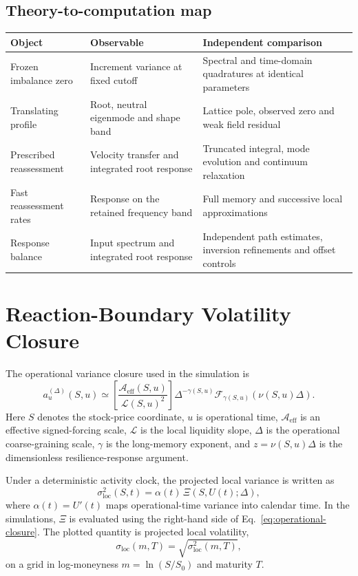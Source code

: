 \documentclass[11pt]{article}
\newcommand{\Aeff}{\mathcal A_{\mathrm{eff}}}
\newcommand{\Liq}{\mathcal L}
\newcommand{\Fresp}{\mathcal F}
\newcommand{\sigloc}{\sigma_{\mathrm{loc}}}
\begin{document}
\subsection{Theory-to-computation map}
\begin{center}
\small
\begin{tabular}{p{.23\linewidth}p{.31\linewidth}p{.36\linewidth}}
\toprule
Object & Observable & Independent comparison \\
\midrule
Frozen imbalance zero & Increment variance at fixed cutoff & Spectral and time-domain quadratures at identical parameters \\
Translating profile & Root, neutral eigenmode and shape band & Lattice pole, observed zero and weak field residual \\
Prescribed reassessment & Velocity transfer and integrated root response & Truncated integral, mode evolution and continuum relaxation \\
Fast reassessment rates & Response on the retained frequency band & Full memory and successive local approximations \\
Response balance & Input spectrum and integrated root response & Independent path estimates, inversion refinements and offset controls \\
\bottomrule
\end{tabular}
\end{center}

\section{Reaction-Boundary Volatility Closure}

The operational variance closure used in the simulation is
\begin{equation}
 a_u^{(\Delta)}(S,u)
 \simeq
 \left[
 \frac{\Aeff(S,u)}
      {\Liq(S,u)^2}
 \right]
 \Delta^{-\gamma(S,u)}
 \Fresp_{\gamma(S,u)}\!\left(\nu(S,u)\Delta\right).
 \label{eq:operational-closure}
\end{equation}
Here \(S\) denotes the stock-price coordinate, \(u\) is operational time,
\(\Aeff\) is an effective signed-forcing scale, \(\Liq\) is the local
liquidity slope, \(\Delta\) is the operational coarse-graining scale,
\(\gamma\) is the long-memory exponent, and
\(z=\nu(S,u)\Delta\) is the dimensionless resilience-response argument.

Under a deterministic activity clock, the projected local variance is written
as
\begin{equation}
 \sigloc^2(S,t)
 =
 \alpha(t)\,
 \Xi(S,U(t);\Delta),
 \label{eq:projected-local-variance}
\end{equation}
where \(\alpha(t)=U'(t)\) maps operational-time variance into calendar time. In the
simulations, \(\Xi\) is evaluated using the right-hand side of
Eq.~\eqref{eq:operational-closure}. The plotted quantity is projected local
volatility,
\begin{equation}
 \sigloc(m,T)=\sqrt{\sigloc^2(m,T)},
 \label{eq:plotted-volatility}
\end{equation}
on a grid in log-moneyness \(m=\ln(S/S_0)\) and maturity \(T\).
\end{document}
